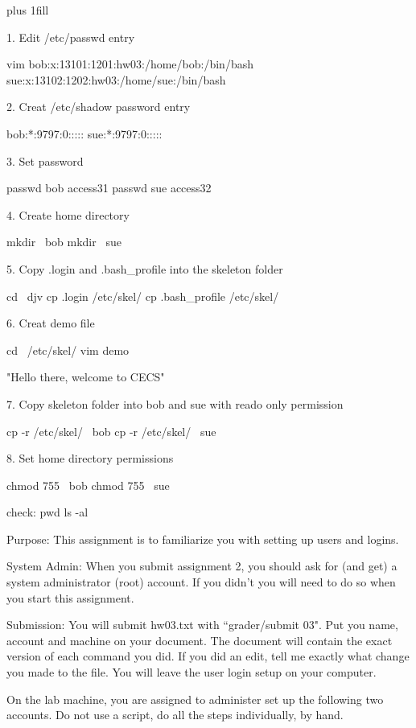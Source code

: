 
\rightskip=0pt plus 1fill

\parindent 0pt

1.
Edit /etc/passwd entry

vim
bob:x:13101:1201:hw03:/home/bob:/bin/bash
sue:x:13102:1202:hw03:/home/sue:/bin/bash

2. 
Creat /etc/shadow password entry

bob:*:9797:0:::::
sue:*:9797:0:::::

3.
Set password

passwd bob
access31
passwd sue
access32

4.
Create home directory

mkdir ~bob
mkdir ~sue

5.
Copy .login and .bash_profile into the skeleton folder

cd ~djv
cp .login /etc/skel/
cp .bash_profile /etc/skel/

6.
Creat demo file

cd ~/etc/skel/
vim demo

"Hello there, welcome to CECS"

7.
Copy skeleton folder into bob and sue with reado only permission

cp -r /etc/skel/ ~bob
cp -r /etc/skel/ ~sue

8.
Set home directory permissions

chmod 755 ~bob
chmod 755 ~sue


check: 
pwd
ls -al

Purpose: This assignment is to familiarize you with setting up users and logins.

System Admin: When you submit assignment 2, you should ask for (and get)
a system administrator (root) account. If you didn't you will need to do so
when you start this assignment.

Submission: You will submit hw03.txt with ``\tilde grader/submit 03".
Put you name, account and machine on your document.
The document will contain the exact version of each command you did.
If you did an edit, tell me exactly what change you made to the file. 
You will leave the user login setup on your computer.

On the lab machine, you are assigned to administer set up the
following two accounts.
Do not use a script, do all the steps individually, by hand.

